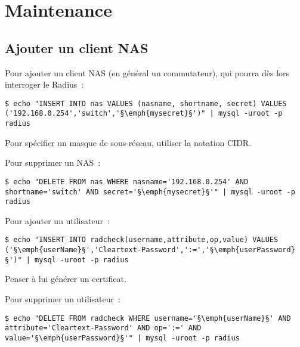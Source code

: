 \section{Maintenance}
\subsection{Ajouter un client NAS}

Pour ajouter un client NAS (en général un commutateur), qui pourra dès lors interroger le Radius~:

\begin{lstlisting}
$ echo "INSERT INTO nas VALUES (nasname, shortname, secret) VALUES ('192.168.0.254','switch','§\emph{mysecret}§')" | mysql -uroot -p radius
\end{lstlisting}

Pour spécifier un masque de sous-réseau, utiliser la notation CIDR.

Pour supprimer un NAS~:

\begin{lstlisting}
$ echo "DELETE FROM nas WHERE nasname='192.168.0.254' AND shortname='switch' AND secret='§\emph{mysecret}§'" | mysql -uroot -p radius
\end{lstlisting}

Pour ajouter un utilisateur~:

\begin{lstlisting}
$ echo "INSERT INTO radcheck(username,attribute,op,value) VALUES ('§\emph{userName}§','Cleartext-Password',':=','§\emph{userPassword}§')" | mysql -uroot -p radius
\end{lstlisting}

Penser à lui générer un certificat.

Pour supprimer un utilisateur~:

\begin{lstlisting}
$ echo "DELETE FROM radcheck WHERE username='§\emph{userName}§' AND attribute='Cleartext-Password' AND op=':=' AND value='§\emph{userPassword}§'" | mysql -uroot -p radius
\end{lstlisting}
